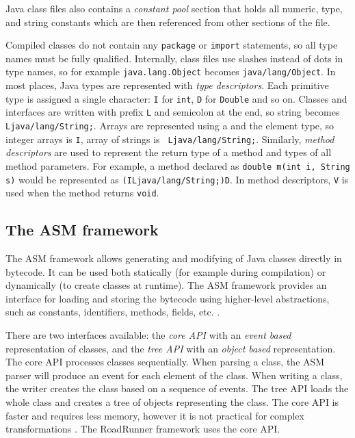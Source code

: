 Java class files also contains a \emph{constant pool} section that holds all
numeric, type, and string constants which are then referenced from other
sections of the file.


Compiled classes do not contain any \texttt{package} or \texttt{import}
statements, so all type names must be fully qualified. Internally, class files
use slashes instead of dots in type names, so for example
\texttt{java.lang.Object} becomes \texttt{java/lang/Object}. In most places,
Java types are represented with \emph{type descriptors}. Each primitive type is
assigned a single character: \texttt{I} for \texttt{int}, \texttt{D} for
\texttt{Double} and so on. Classes and interfaces are written with prefix
\texttt{L} and semicolon at the end, so string becomes
\texttt{Ljava/lang/String;}. Arrays are represented using a
\texttt{\leftbracket} and the element type, so integer arrays is
\texttt{\leftbracket I}, array of strings is \texttt{\leftbracket
Ljava/lang/String;}. Similarly, \emph{method descriptors} are used to represent
the return type of a method and types of all method parameters. For example, a
method declared as \texttt{double m(int i, String s)} would be represented as
\texttt{(ILjava/lang/String;)D}. In method descriptors, \texttt{V} is used when
the method returns \texttt{void}.


\subsection{The ASM framework}

The ASM framework allows generating and modifying of Java classes directly in
bytecode. It can be used both statically (for example during compilation) or
dynamically (to create classes at runtime). The ASM framework provides an
interface for loading and storing the bytecode using higher-level abstractions,
such as constants, identifiers, methods, fields, etc. \cite{asmguide}.

There are two interfaces available: the \emph{core API} with an \emph{event
based} representation of classes, and the \emph{tree API} with an \emph{object
based} representation. The core API processes classes sequentially. When parsing
a class, the ASM parser will produce an event for each element of the class.
When writing a class, the writer creates the class based on a sequence of
events. The tree API loads the whole class and creates a tree of objects
representing the class. The core API is faster and requires less memory, however
it is not practical for complex transformations \cite{asmguide}. The RoadRunner
framework uses the core API.

